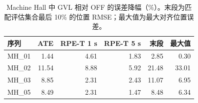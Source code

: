 \begin{table}[tb]
\caption{Machine Hall 中 GVL 相对 OFF 的误差降幅（\%）。末段为匹配评估集合最后 10\% 的位置 RMSE；最大值为最大对齐位置误差。}\label{tab:mhmetrics}
\centering\small
\begin{tabular}{lrrrrr}
\toprule
序列 & ATE & RPE-T 1 s & RPE-T 5 s & 末段 & 最大值 \\
\midrule
MH\_01 & 1.44 & 4.61 & 1.83 & 2.85 & 0.30 \\
MH\_02 & 11.54 & 8.88 & 5.92 & 21.48 & 33.01 \\
MH\_03 & 8.85 & 2.31 & 2.43 & 11.07 & 6.95 \\
MH\_05 & 8.49 & 2.31 & 1.47 & 8.48 & 6.34 \\
\bottomrule
\end{tabular}
\end{table}
